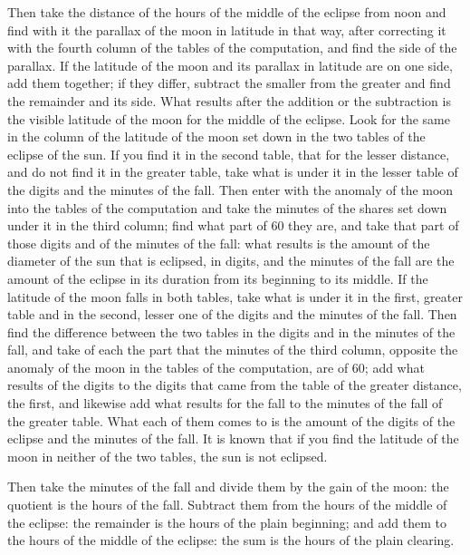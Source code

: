\documentclass[11pt]{article}
\newcommand{\ArPage}[1]{\marginpar{\footnotesize\color{gray}Ar.\,p.\,#1}}
\begin{document}
\par \ArPage{168}Then take the distance of the hours of the middle of the eclipse from noon and find with it the parallax of the moon in latitude in that way, after correcting it with the fourth column of the tables of the computation, and find the side of the parallax. If the latitude of the moon and its parallax in latitude are on one side, add them together; if they differ, subtract the smaller from the greater and find the remainder and its side. What results after the addition or the subtraction is the visible latitude of the moon for the middle of the eclipse. Look for the same in the column of the latitude of the moon set down in the two tables of the eclipse of the sun. If you find it in the second table, that for the lesser distance, and do not find it in the greater table, take what is under it in the lesser table of the digits and the minutes of the fall. Then enter with the anomaly of the moon into the tables of the computation and take the minutes of the shares set down under it in the third column; find what part of 60 they are, and take that part of those digits and of the minutes of the fall: what results is the amount of the diameter of the sun that is eclipsed, in digits, and the minutes of the fall are the amount of the eclipse in its duration from its beginning to its middle. If the latitude of the moon falls in both tables, take what is under it in the first, greater table and in the second, lesser one of the digits and the minutes of the fall. Then find the difference between the two tables in the digits and in the minutes of the fall, and take of each the part that the minutes of the third column, opposite the anomaly of the moon in the tables of the computation, are of 60; add what results of the digits to the digits that came from the table of the greater distance, the first, and likewise add what results for the fall to the minutes of the fall of the greater table. What each of them comes to is the amount of the digits of the eclipse and the minutes of the fall. It is known that if you find the latitude of the moon in neither of the two tables, the sun is not eclipsed.\par
\par Then take the minutes of the fall and divide them by the gain of the moon: the quotient is the hours of the fall. Subtract them from the hours of the middle of the eclipse: the remainder is the hours of the plain beginning; and add them to the hours of the middle of the eclipse: the sum is the hours of the plain clearing.\par
\end{document}
